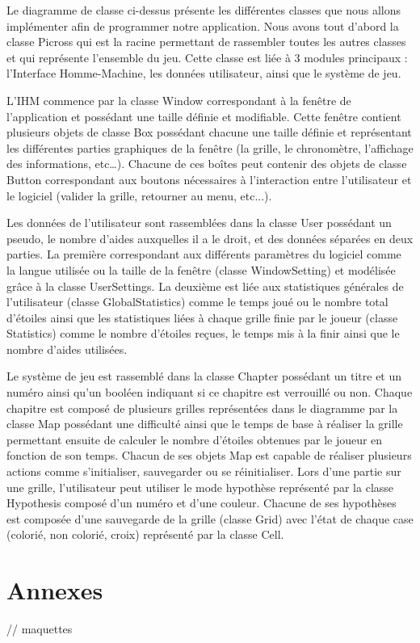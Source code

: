 \documentclass{report}
\begin{document}
    	
	Le diagramme de classe ci-dessus présente les différentes classes que nous allons implémenter afin de programmer notre application. Nous avons tout d’abord la classe Picross qui est la racine permettant de rassembler toutes les autres classes et qui représente l’ensemble du jeu. Cette classe est liée à 3 modules principaux : l’Interface Homme-Machine, les données utilisateur, ainsi que le système de jeu.

	L’IHM commence par la classe Window  correspondant à la fenêtre de l’application et possédant une taille définie et modifiable. Cette fenêtre contient plusieurs objets de classe Box possédant chacune une taille définie et représentant les différentes parties graphiques de la fenêtre (la grille, le chronomètre, l’affichage des informations, etc…). Chacune de ces boîtes peut contenir des objets de classe Button correspondant aux boutons nécessaires à l’interaction entre l’utilisateur et le logiciel (valider la grille, retourner au menu, etc...).

	Les données de l’utilisateur sont rassemblées dans la classe User possédant un pseudo, le nombre d’aides auxquelles il a le droit, et des données séparées en deux parties. La première correspondant aux différents paramètres du logiciel comme la langue utilisée ou la taille de la fenêtre (classe WindowSetting) et modélisée grâce à la classe UserSettings. La deuxième est liée aux statistiques  générales de l’utilisateur (classe GlobalStatistics) comme le temps joué ou le nombre total d’étoiles ainsi que les statistiques liées à chaque grille finie par le joueur (classe Statistics) comme le nombre d’étoiles reçues, le temps mis à la finir ainsi que le nombre d’aides utilisées.

 	Le système de jeu est rassemblé dans la classe Chapter possédant un titre et un numéro ainsi qu’un booléen indiquant si ce chapitre est verrouillé ou non. Chaque chapitre est composé de plusieurs grilles représentées dans le diagramme par la classe Map possédant une difficulté ainsi que le temps de base à réaliser la grille permettant ensuite de calculer le nombre d’étoiles obtenues par le joueur en fonction de son temps. Chacun de ses objets Map est capable de réaliser plusieurs actions comme s’initialiser, sauvegarder ou se réinitialiser. Lors d’une partie sur une grille, l’utilisateur peut utiliser le mode hypothèse représenté par la classe Hypothesis composé d’un numéro et d’une couleur. Chacune de ses hypothèses est composée d’une sauvegarde de la grille (classe Grid) avec l’état de chaque case (colorié, non colorié, croix) représenté par la classe Cell.


\chapter{Annexes}

      // maquettes
\end{document}
